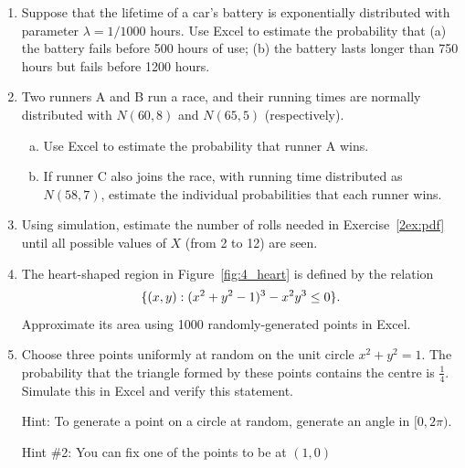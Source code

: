 \begin{enumerate}[label={2.\arabic*},leftmargin=1cm]
\begin{enumerate}
	  \end{enumerate}
  \item Suppose that the lifetime of a car's battery is exponentially distributed with parameter $\lambda = 1/1000$ hours. Use Excel to estimate the probability that (a) the battery fails before 500 hours of use; (b) the battery lasts longer than 750 hours but fails before 1200 hours.
  \item Two runners A and B run a race, and their running times are normally distributed with $N(60,8)$ and $N(65,5)$ (respectively).
	  \begin{enumerate}[(a)]
		  \item Use Excel to estimate the probability that runner A wins.
		  \item If runner C also joins the race, with running time distributed as $N(58,7)$, estimate the individual probabilities that each runner wins.
	  \end{enumerate}
  \item Using simulation, estimate the number of rolls needed in Exercise~\ref{2ex:pdf} until all possible values of $X$ (from 2 to 12) are seen.
	\item The heart-shaped region in Figure~\ref{fig:4_heart} is defined by the relation \vspace{-0.1cm}$$\{(x,y) : (x^2 + y^2 - 1)^3 - x^2y^3 \leq 0\}. \vspace{-0.1cm}$$
		Approximate its area using 1000 randomly-generated points in Excel.
	\item Choose three points uniformly at random on the unit circle $x^2 + y^2 = 1$.
		The probability that the triangle formed by these points contains the centre is $\frac{1}{4}$.
		Simulate this in Excel and verify this statement.

		Hint: To generate a point on a circle at random, generate an angle in $[0,2\pi)$.

		Hint \#2: You can fix one of the points to be at $(1,0)$
\end{enumerate}

